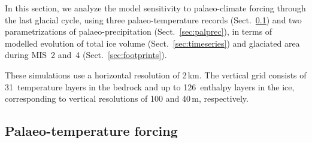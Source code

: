\documentclass[tc, manuscript]{copernicus}
\begin{document}
    In this section, we analyze the model sensitivity to palaeo-climate forcing
    through the last glacial cycle, using three palaeo-temperature records
    (Sect.~\ref{sec:paltemp}) and two parametrizations of palaeo-precipitation
    (Sect.~\ref{sec:palprec}), in terms of modelled evolution of total ice
    volume (Sect.~\ref{sec:timeseries}) and glaciated area during MIS~2 and~4
    (Sect.~\ref{sec:footprints}).

    These simulations use a horizontal resolution of 2\,km. The vertical grid
    consists of 31~temperature layers in the bedrock and up to 126~enthalpy
    layers in the ice, corresponding to vertical resolutions of 100 and
    40\,m, respectively.


\subsection{Palaeo-temperature forcing}
\label{sec:paltemp}
\end{document}
